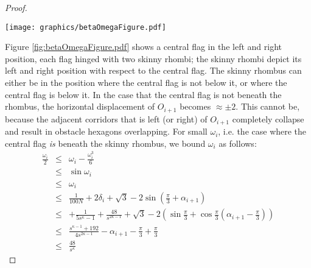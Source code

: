 \documentclass[10pt]{CSUNthesis}
\theoremstyle{plain}%
\theoremstyle{definition}
\theoremstyle{remark}
\newcommand{\lr}[1]{\left( #1 \right)}
\begin{document}
\begin{proof}
\begin{minipage}{\linewidth}
\begin{center}
\texttt{[image: graphics/betaOmegaFigure.pdf]}
\label{fig:betaOmegaFigure.pdf}
\end{center}
\end{minipage}

Figure \ref{fig:betaOmegaFigure.pdf} shows a central flag in the left and right position, each flag hinged with two skinny rhombi; the skinny rhombi depict its left and right position with respect to the central flag.
The skinny rhombus can either be in the position where the central flag is not below it, or where the central flag is below it.  
In the case that the central flag is not beneath the rhombus, the horizontal displacement of $O_{i+1}$ becomes $\approx \pm 2$.  
This cannot be, because the adjacent corridors that is left (or right) of $O_{i+1}$ completely collapse and result in obstacle hexagons overlapping.
For small $\omega_i$, i.e. the case where the central flag \textit{is} beneath the skinny rhombus, we bound $\omega_i$ as follows:
\begin{eqnarray*}
\frac{\omega_i}{2}&\leq& \omega_i - \frac{\omega_i^3}{6} \\
&\leq& \sin \omega_i\\
&\leq& \omega_i \\
&\leq& \frac{1}{100N} + 2 \delta_i + \sqrt{3}- 2 \sin \lr{\frac{\pi}{3} + \alpha_{i+1}}\\
&\leq&+ \frac{1}{5s^\kappa - 1} + \frac{48}{s^{2\kappa - 1}} +\sqrt{3} - 2 \lr{\sin \frac{\pi}{3} + \cos \frac{\pi}{3} \lr{\alpha_{i+1} - \frac{\pi}{3} } }\\
&\leq&  \frac{s^{\kappa-1} + 192}{4 s^{2\kappa-1}} - \alpha_{i+1} - \frac{\pi}{3} + \frac{\pi}{3}\\
&\leq& \frac{48}{s^\kappa}
\end{eqnarray*}


\end{proof}
\end{document}
